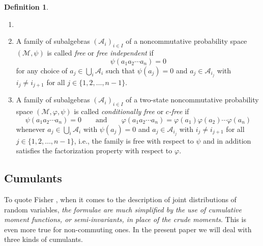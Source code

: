 \documentclass[12pt]{amsart}
\newcommand{\alg}[1]{\mathcal{#1}}
\theoremstyle{definition}
\newtheorem{definition}[theorem]{Definition}
\numberwithin{equation}{section}
\begin{document}
\begin{definition}
  \begin{enumerate}[label=(\roman*)]
   \item []
   \item 
  A family of subalgebras $(\alg{A}_i)_{i\in I}$ of a noncommutative probability space $(\alg{M},\psi)$ is called \emph{free} or \emph{free independent} if
  \begin{equation*}
    \psi(a_1a_2\dotsm a_n)=  0
  \end{equation*}
  for any choice of $a_j\in \bigcup_i\alg{A}_i$ such that $\psi(a_j)=0$ and
  $a_j\in\alg{A}_{i_j}$ with $i_j\ne i_{j+1}$ for all $j\in\{1,2,\dots,n-1\}$.
   \item 
  A family of subalgebras $(\alg{A}_i)_{i\in I}$ of a two-state noncommutative probability space $(\alg{M},\varphi,\psi)$ is called
  \emph{conditionally free} or \emph{$c$-free} if
  \begin{equation*}
   \psi(a_1a_2\cdots a_n) = 0\qquad\mbox{and}\qquad \varphi(a_1a_2\dotsm a_n)=  \varphi(a_1)\varphi(a_2)\dotsm\varphi(a_n)
  \end{equation*}
  whenever $a_j\in \bigcup_i\alg{A}_i$ with $\psi(a_j)=0$ and
  $a_j\in\alg{A}_{i_j}$ with $i_j\ne i_{j+1}$ for all $j\in\{1,2,\dots,n-1\}$,
  i.e., the family is free with respect to $\psi$ and in addition satisfies the
  factorization property with respect to $\varphi$.
  \end{enumerate}
\end{definition}




\subsection{Cumulants}
To quote Fisher  \cite{Fisher:1929:moments},
 when it comes to the description of joint distributions of random variables,
\emph{the formulae are
much simplified by the use of cumulative
moment functions, or semi-invariants, in
place of the crude moments}.
This is even more true for non-commuting ones. In the present paper we will deal with three kinds of cumulants.
\end{document}
